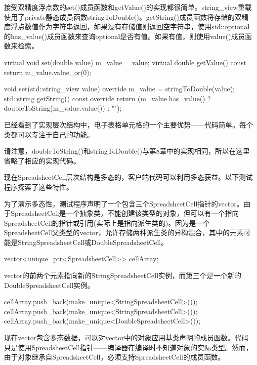 接受双精度浮点数的set()成员函数和getValue()的实现都很简单。string\_view重载使用了private静态成员函数stringToDouble()。getString()成员函数将存储的双精度浮点数值作为字符串返回，如果没有存储值则返回空字符串，使用std::optional的has\_value()成员函数来查询optional是否有值。如果有值，则使用value()成员函数来检索。

\begin{cpp}
virtual void set(double value) { m_value = value; }
virtual double getValue() const { return m_value.value_or(0); }

void set(std::string_view value) override { m_value = stringToDouble(value); }
std::string getString() const override
{
    return (m_value.has_value() ? doubleToString(m_value.value()) : "");
}
\end{cpp}

已经看到了实现层次结构中，电子表格单元格的一个主要优势——代码简单。每个类都可以专注于自己的功能。

请注意，doubleToString()和stringToDouble()与第8章中的实现相同，所以在这里省略了相应的实现代码。


现在SpreadsheetCell层次结构是多态的，客户端代码可以利用多态获益。以下测试程序探索了这些特性。

为了演示多态性，测试程序声明了一个包含三个SpreadsheetCell指针的vector。由于SpreadsheetCell是一个抽象类，不能创建该类型的对象，但可以有一个指向SpreadsheetCell的指针或引用(实际上是指向派生类的)。因为是一个SpreadsheetCell父类型的vector，允许存储两种派生类的异构混合，其中的元素可能是StringSpreadsheetCell或DoubleSpreadsheetCell。

\begin{cpp}
vector<unique_ptr<SpreadsheetCell>> cellArray;
\end{cpp}

vector的前两个元素指向新的StringSpreadsheetCell实例，而第三个是一个新的DoubleSpreadsheetCell实例。

\begin{cpp}
cellArray.push_back(make_unique<StringSpreadsheetCell>());
cellArray.push_back(make_unique<StringSpreadsheetCell>());
cellArray.push_back(make_unique<DoubleSpreadsheetCell>());
\end{cpp}

现在vector包含多态数据，可以对vector中的对象应用基类声明的成员函数。代码只是使用SpreadsheetCell指针——编译器在编译时不知道对象的实际类型。然而，由于对象继承自SpreadsheetCell，必须支持SpreadsheetCell的成员函数。

